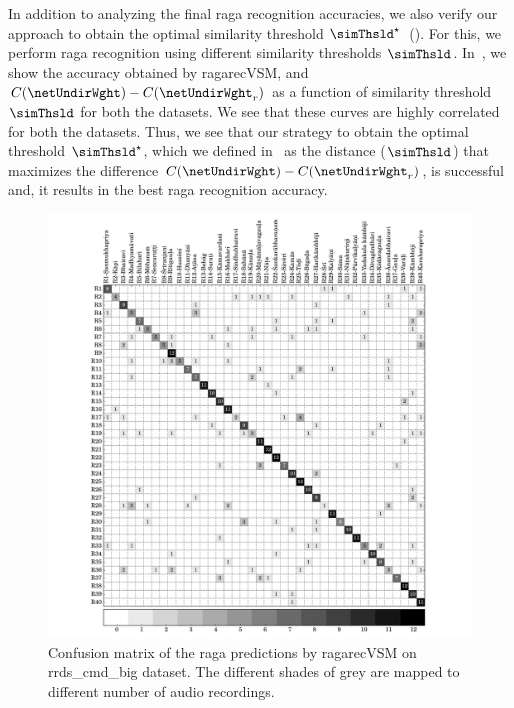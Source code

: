 In addition to analyzing the final \gls{raga} recognition accuracies, we also verify our approach to obtain the optimal similarity threshold $\simThsld^\star$~(). For this, we perform \gls{raga} recognition using different similarity thresholds $\simThsld$. In~, we show the accuracy obtained by \acrshort{ragarecVSM}, and  $C(\netUndirWght)-C(\netUndirWght_r)$ as a function of similarity threshold $\simThsld$ for both the datasets. We see that these curves are highly correlated for both the datasets. Thus, we see that our strategy to obtain the optimal threshold $\simThsld^\star$, which we defined in~ as the distance ($\simThsld$) that maximizes the difference $C(\netUndirWght)-C(\netUndirWght_r)$, is successful and, it results in the best \gls{raga} recognition accuracy.

\begin{figure}[h]
	\begin{center}
		\includegraphics[width=\figSizeNinety]{ch07_ragaRecognition/figures/CM_vsm_cmd_var1.pdf}
	\end{center}
	\caption[Confusion matrix of classification results by \acrshort{ragarecVSM} on \acrshort{rrds_cmd_big}]{Confusion matrix of the \gls{raga} predictions by \acrshort{ragarecVSM} on \acrshort{rrds_cmd_big} dataset. The different shades of grey are mapped to different number of audio recordings.}
	\label{fig:confusion_matrix_cmd}
\end{figure}

